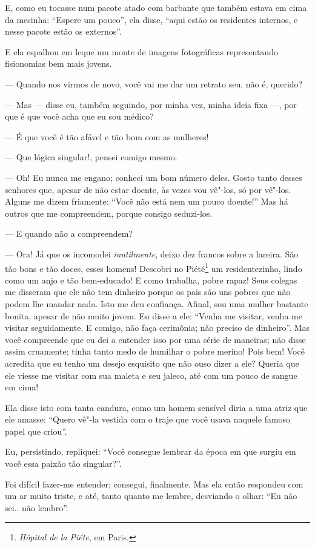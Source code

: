 E, como eu tocasse num pacote atado com barbante que também estava em cima da
mesinha: “Espere um pouco'', ela disse, “aqui estão os residentes internos, e nesse pacote estão os externos''.

E ela espalhou em leque um monte de imagens fotográficas 
representando fisionomias bem mais jovens.

--- Quando nos virmos de novo, você vai me dar um retrato seu,
não é, querido?

--- Mas --- disse eu, também seguindo, por minha vez, minha ideia fixa ---,
por que é que você acha que eu sou médico?

--- É que você é tão afável e tão bom com as mulheres!

--- Que lógica singular!, pensei comigo mesmo.

--- Oh! Eu nunca me engano; conheci um bom número deles. Gosto tanto
desses senhores que, apesar de não estar doente, às vezes vou vê"-los,
só por vê"-los. Alguns me dizem friamente: “Você não
está nem um pouco doente!'' Mas há outros que me
compreendem, porque consigo seduzi-los.

--- E quando não a compreendem?

--- Ora! Já que os incomodei \textit{inutilmente}, deixo dez francos sobre a
lareira. São tão bons e tão doces, esses homens! Descobri no
Piété\protect\footnote{  \textit{Hôpital de la Piéte}, em Paris.}
 um residentezinho, lindo como um anjo
e tão bem-educado! E como trabalha, pobre rapaz! Seus colegas me
disseram que ele não tem dinheiro porque os pais são uns pobres que
não podem lhe mandar nada. Isto me deu confiança. Afinal, sou uma
mulher bastante bonita, apesar de não muito jovem. Eu disse a ele:
“Venha me visitar, venha me visitar seguidamente. E
comigo, não faça cerimônia; não preciso de dinheiro''. Mas
você compreende que eu dei a entender isso por uma série de
maneiras; não disse assim cruamente; tinha tanto medo de
humilhar o pobre merino! Pois bem! Você acredita que eu tenho um
desejo esquisito que não ouso dizer a ele? Queria que ele viesse
me visitar com sua maleta e seu jaleco, até com um pouco de sangue em
cima!

Ela disse isto com tanta candura, como um homem sensível diria a
uma atriz que ele amasse: “Quero vê"-la vestida com o
traje que você usava naquele famoso papel que criou''.

Eu, persistindo, repliquei: “Você consegue lembrar da época
em que surgiu em você essa paixão tão singular?''.

Foi difícil fazer-me entender; consegui, finalmente. Mas ela então respondeu
com um ar muito triste, e até, tanto quanto me lembre, desviando o
olhar: “Eu não sei.. não lembro''.

